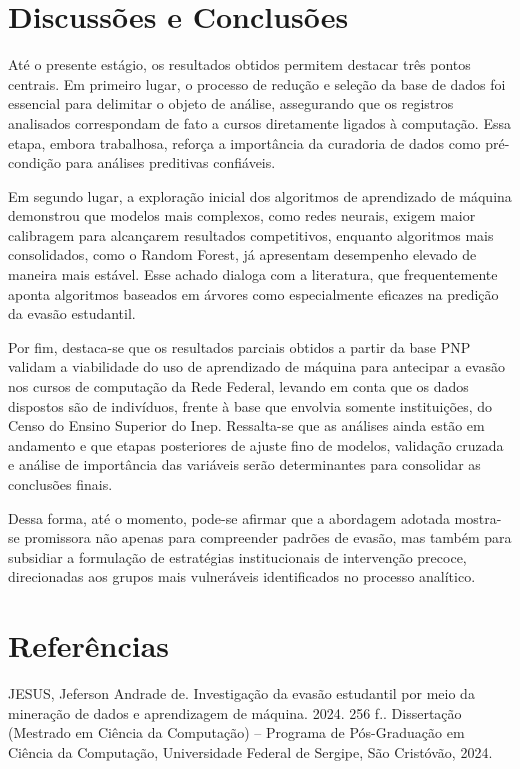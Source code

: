 \documentclass[english, spanish, brazilian]{RBIEarticle} %
\begin{document}
\section{Discussões e Conclusões}
Até o presente estágio, os resultados obtidos permitem destacar três pontos centrais. Em primeiro lugar, o processo de redução e seleção da base de dados foi essencial para delimitar o objeto de análise, assegurando que os registros analisados correspondam de fato a cursos diretamente ligados à computação. Essa etapa, embora trabalhosa, reforça a importância da curadoria de dados como pré-condição para análises preditivas confiáveis.

Em segundo lugar, a exploração inicial dos algoritmos de aprendizado de máquina demonstrou que modelos mais complexos, como redes neurais, exigem maior calibragem para alcançarem resultados competitivos, enquanto algoritmos mais consolidados, como o Random Forest, já apresentam desempenho elevado de maneira mais estável. Esse achado dialoga com a literatura, que frequentemente aponta algoritmos baseados em árvores como especialmente eficazes na predição da evasão estudantil.

Por fim, destaca-se que os resultados parciais obtidos a partir da base PNP validam a viabilidade do uso de aprendizado de máquina para antecipar a evasão nos cursos de computação da Rede Federal, levando em conta que os dados dispostos são de indivíduos, frente à base que envolvia somente instituições, do Censo do Ensino Superior do Inep. Ressalta-se que as análises ainda estão em andamento e que etapas posteriores de ajuste fino de modelos, validação cruzada e análise de importância das variáveis serão determinantes para consolidar as conclusões finais.

Dessa forma, até o momento, pode-se afirmar que a abordagem adotada mostra-se promissora não apenas para compreender padrões de evasão, mas também para subsidiar a formulação de estratégias institucionais de intervenção precoce, direcionadas aos grupos mais vulneráveis identificados no processo analítico.




\section*{Referências}
JESUS, Jeferson Andrade de. Investigação da evasão estudantil por meio da mineração de dados e aprendizagem de máquina. 2024. 256 f.. Dissertação (Mestrado em Ciência da Computação) – Programa de Pós-Graduação em Ciência da Computação, Universidade Federal de Sergipe, São Cristóvão, 2024.
\end{document}
